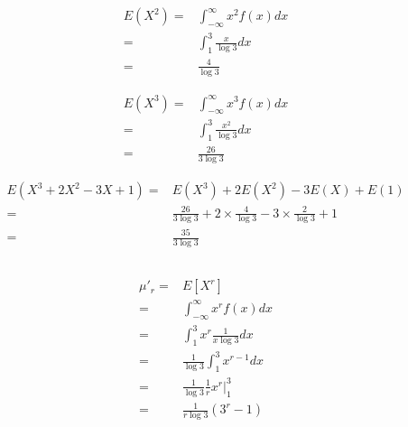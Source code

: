 \documentclass{article}
\begin{document}
                \begin{equation*}
                    \begin{split}
                        E(X^2)=&\int _{-\infty} ^\infty x^2f(x) dx\\
                            =&\int _1 ^3 \frac{x}{\log 3} dx\\
                            =&\frac{4}{\log 3}
                    \end{split}
                \end{equation*}

                \begin{equation*}
                    \begin{split}
                        E(X^3)=&\int _{-\infty} ^\infty x^3f(x) dx\\
                            =&\int _1 ^3 \frac{x^2}{\log 3} dx\\
                            =&\frac{26}{3\log 3}
                    \end{split}
                \end{equation*}

                \begin{equation*}
                    \begin{split}
                        E(X^3+2X^2-3X+1)=&E(X^3)+2E(X^2)-3E(X)+E(1)\\
                            =&\frac{26}{3\log 3}+2\times \frac{4}{\log 3} -3\times \frac{2}{\log 3}+1\\
                            =&\frac{35}{3\log3}
                    \end{split}
                \end{equation*}

        \subsection{}
            \begin{equation*}
                \begin{split}
                    \mu'_r=&E[X^r]\\
                        =&\int _{-\infty} ^\infty x^rf(x)dx\\
                        =&\int _1 ^3 x^r \frac{1}{x\log 3}dx\\
                        =&\frac{1}{\log 3}\int _1 ^3 x^{r-1} dx\\
                        =&\frac{1}{\log 3} \frac{1}{r}x^r|_1^3\\
                        =&\frac{1}{r\log 3}(3^r-1)
                \end{split}
            \end{equation*}
\end{document}
